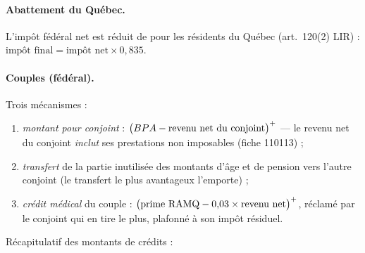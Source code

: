 \paragraph{Abattement du Québec.} L'impôt fédéral net est réduit de
 pour les résidents du Québec (art.~120(2) LIR) :
$\text{impôt final} = \text{impôt net} \times 0{,}835$.

\paragraph{Couples (fédéral).} Trois mécanismes :
\begin{enumerate}
  \item \emph{montant pour conjoint} : $\bigl(BPA - \text{revenu net du
        conjoint}\bigr)^{+}$ --- le revenu net du conjoint \emph{inclut} ses
        prestations non imposables (fiche 110113) ;
  \item \emph{transfert} de la partie inutilisée des montants d'âge et de
        pension vers l'autre conjoint (le transfert le plus avantageux
        l'emporte) ;
  \item \emph{crédit médical} du couple :
        $\bigl(\text{prime RAMQ} - 0{,}03 \times \text{revenu net}\bigr)^{+}$,
        réclamé par le conjoint qui en tire le plus, plafonné à son impôt
        résiduel.
\end{enumerate}

\pparams Récapitulatif des montants de crédits :

